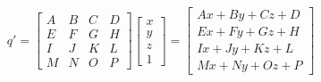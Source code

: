 $$
q' =
\begin{bmatrix}
  A & B & C & D \\
  E & F & G & H \\
  I & J & K & L \\
  M & N & O & P
\end{bmatrix}
\begin{bmatrix}
  x \\
  y \\
  z \\
  1
\end{bmatrix}
=
\begin{bmatrix}
  Ax + By + Cz + D \\
  Ex + Fy + Gz + H \\
  Ix + Jy + Kz + L \\
  Mx + Ny + Oz + P
\end{bmatrix}
$$
